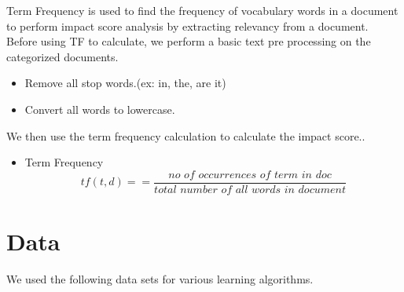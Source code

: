 \documentclass[paper=a4, fontsize=11pt]{scrartcl}
\numberwithin{equation}{section}		%
\numberwithin{figure}{section}			%
\numberwithin{table}{section}				%
\begin{document}
Term Frequency is used to find the frequency of vocabulary words in a document to perform impact score analysis by extracting relevancy from a document.
Before using TF to calculate, we perform a basic text pre processing on the categorized documents.
\begin{itemize}
\item {Remove all stop words.(ex: in, the, are it)}
\item {Convert all words to lowercase.}
\end {itemize}
We then use the term frequency calculation to calculate the impact score..
\begin{itemize}
\item {Term Frequency}
\[tf(t,d) =  = \frac{\textit{no of occurrences of term in doc} }{\textit{total number of all words in document}}\]
\end{itemize}



\section{Data}
We used the following data sets for various learning algorithms.
\end{document}
